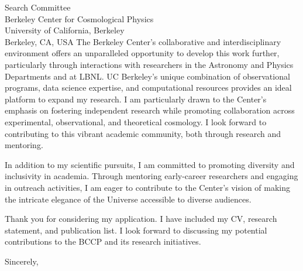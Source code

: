 \documentclass[11pt]{letter}
\begin{document}
\begin{letter}{Search Committee \\ Berkeley Center for Cosmological Physics \\ University of California, Berkeley \\ Berkeley, CA, USA}
The Berkeley Center's collaborative and interdisciplinary environment offers an unparalleled opportunity to develop this work further, particularly through interactions with researchers in the Astronomy and Physics Departments and at LBNL. UC Berkeley's unique combination of observational programs, data science expertise, and computational resources provides an ideal platform to expand my research. I am particularly drawn to the Center's emphasis on fostering independent research while promoting collaboration across experimental, observational, and theoretical cosmology. I look forward to contributing to this vibrant academic community, both through research and mentoring.

In addition to my scientific pursuits, I am committed to promoting diversity and inclusivity in academia. Through mentoring early-career researchers and engaging in outreach activities, I am eager to contribute to the Center's vision of making the intricate elegance of the Universe accessible to diverse audiences.

Thank you for considering my application. I have included my CV, research statement, and publication list. I look forward to discussing my potential contributions to the BCCP and its research initiatives.

\closing{Sincerely,}

\end{letter}
\end{document}
